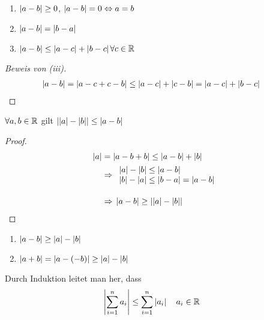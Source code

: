 \begin{satz}
    \label{satz:diff-abs}
    \theoremescape
    \begin{enumerate}[label=(\roman*)]
        \item $\abs{a-b}\geq 0$, $\abs{a-b} = 0\equivalent a = b$
        \item $\abs{a-b} = \abs{b-a}$
        \item $\abs{a-b}\leq \abs{a-c} + \abs{b-c}$\quad $\forall c\in\R$ %
    \end{enumerate}
    \begin{proof}[Beweis von (iii)]
        \begin{align*}
            \abs{a-b} &= \abs{a-c+c-b} \leq \abs{a-c}+\abs{c-b} = \abs{a-c}+\abs{b-c}\qedhere
        \end{align*}
    \end{proof}
\end{satz}

\begin{satz} %
    $\forall a,b\in\R$ gilt $\abs{\abs{a}-\abs{b}}\leq\abs{a-b}$
    \begin{proof}
        \begin{align*}
            \abs{a} &= \abs{a-b+b} \leq \abs{a-b} + \abs{b}\\
            &\impl
            \begin{array}{l}
                \abs{a}-\abs{b} \leq \abs{a-b} \\
                \abs{b}-\abs{a} \leq \abs{b-a} = \abs{a-b}
            \end{array}
            \\[10pt]
            &\impl \abs{a-b}\geq\abs{\abs{a}-\abs{b}}\qedhere
        \end{align*}
    \end{proof}
\end{satz}

\begin{folgerung}
    \theoremescape
    \begin{enumerate}[label=(\roman*)]
        \item $\abs{a-b}\geq \abs{a}-\abs{b}$
        \item $\abs{a+b} = \abs{a-\pair{-b}} \geq \abs{a} - \abs{b}$
    \end{enumerate}
\end{folgerung}

\begin{bemerkung}
    Durch Induktion leitet man her, dass
    \begin{align*}
        \abs{\sum_{i=1}^{n} a_i} &\leq \sum_{i=1}^{n} \abs{a_i}\quad a_i \in\R
    \end{align*}
\end{bemerkung}

\newpage